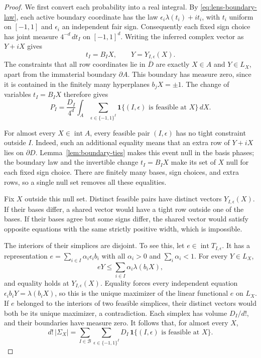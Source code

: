 \begin{proof}
We first convert each probability into a real integral. By
\eqref{eq:lens-boundary-law}, each active boundary coordinate has the
law $\epsilon_i\lambda(t_i)+it_i$, with $t_i$ uniform on $[-1,1]$ and
$\epsilon_i$ an independent fair sign. Consequently each fixed sign
choice has joint measure $4^{-d}\,dt_I$ on $[-1,1]^d$.
Writing the inferred complex vector as $Y+iX$ gives
\[
 t_I=B_IX,\qquad Y=Y_{I,\epsilon}(X).
\]
The constraints that all row coordinates lie in $\overline D$ are
exactly $X\in A$ and $Y\in L_X$, apart from the immaterial boundary
$\partial A$. This boundary has measure zero, since it is contained in
the finitely many hyperplanes $b_jX=\pm1$. The change of variables
$t_I=B_IX$ therefore gives
\begin{equation}\label{eq:probability-real-integral}
 P_I=\frac{D_I}{4^d}\int_A
       \sum_{\epsilon\in\{-1,1\}^I}
         \mathbf1\{(I,\epsilon)\text{ is feasible at }X\}\,dX.
\end{equation}

For almost every $X\in\operatorname{int}A$, every feasible pair
$(I,\epsilon)$ has no tight constraint outside $I$. Indeed, such an
additional equality means that an extra row of $Y+iX$ lies on
$\partial D$. Lemma~\ref{lem:boundary-ties} makes this event null in the
basis phases; the boundary law and the invertible change $t_I=B_IX$
make its set of $X$ null for each fixed sign choice. There are finitely
many bases, sign choices, and extra rows, so a single null set removes
all these equalities.

Fix $X$ outside this null set. Distinct feasible pairs have distinct
vectors $Y_{I,\epsilon}(X)$. If their bases differ, a shared vector would
have a tight row outside one of the bases. If their bases agree but
some signs differ, the shared vector would satisfy opposite equations
with the same strictly positive width, which is impossible.

The interiors of their simplices are disjoint. To see this, let
$e\in\operatorname{int}T_{I,\epsilon}$. It has a representation
$e=\sum_{i\in I}\alpha_i\epsilon_i b_i$ with all $\alpha_i>0$ and
$\sum_i\alpha_i<1$. For every $Y\in L_X$,
\[
 eY\leq\sum_{i\in I}\alpha_i\lambda(b_iX),
\]
and equality holds at $Y_{I,\epsilon}(X)$. Equality forces every
independent equation
$\epsilon_i b_iY=\lambda(b_iX)$, so this is the unique maximizer of the
linear functional $e$ on $L_X$. If $e$ belonged to the interiors of two
feasible simplices, their distinct vectors would both be its unique
maximizer, a contradiction.
Each simplex has volume $D_I/d!$, and their boundaries have measure
zero. It follows that, for almost every $X$,
\begin{equation}\label{eq:simplex-volume-sum}
 d!\,|\Sigma_X|
      =\sum_{I\in\mathcal B}\sum_{\epsilon\in\{-1,1\}^I}
               D_I\,\mathbf1\{(I,\epsilon)\text{ is feasible at }X\}.
\end{equation}


\end{proof}

